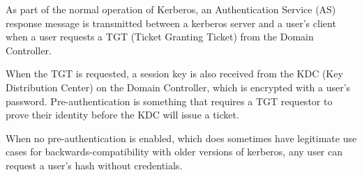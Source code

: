 As part of the normal operation of Kerberos, an Authentication Service (AS) response message is transmitted between a kerberos server and a user's client when a user requests a TGT (Ticket Granting Ticket) from the Domain Controller. 

When the TGT is requested, a session key is also received from the KDC (Key Distribution Center) on the Domain Controller, which is encrypted with a user's password. Pre-authentication is something that requires a TGT requestor to prove their identity before the KDC will issue a ticket. 

When no pre-authentication is enabled, which does sometimes have legitimate use cases for backwards-compatibility with older versions of kerberos, any user can request a user's hash without credentials. 

